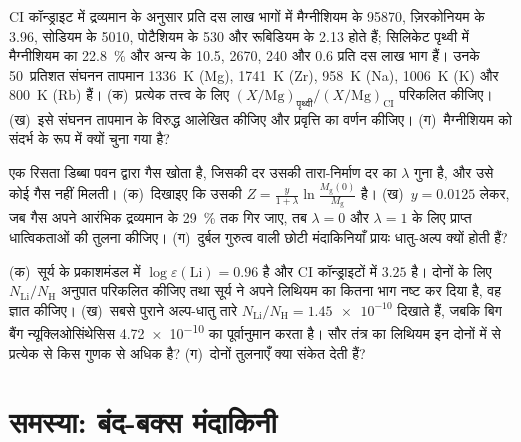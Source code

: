 \begin{exercise}[$\star\star\star$]\label{exo:b3:origin-of-elements:10}
CI कॉन्ड्राइट में द्रव्यमान के अनुसार प्रति दस लाख भागों में मैग्नीशियम के \num{95870},
ज़िरकोनियम के \num{3.96}, सोडियम के \num{5010}, पोटैशियम के \num{530}
और रूबिडियम के \num{2.13} होते हैं; सिलिकेट पृथ्वी में
मैग्नीशियम का \qty{22.8}{\percent} और अन्य के \num{10.5}, \num{2670}, \num{240}
और \num{0.6} प्रति दस लाख भाग हैं। उनके 50~प्रतिशत
संघनन तापमान \qty{1336}{K} (Mg), \qty{1741}{K} (Zr),
\qty{958}{K} (Na), \qty{1006}{K} (K) और \qty{800}{K} (Rb) हैं। (क)~प्रत्येक तत्त्व के लिए
$(X/\mathrm{Mg})_\text{पृथ्वी}/(X/\mathrm{Mg})_\mathrm{CI}$ परिकलित कीजिए।
(ख)~इसे संघनन तापमान के विरुद्ध आलेखित कीजिए और
प्रवृत्ति का वर्णन कीजिए। (ग)~मैग्नीशियम को संदर्भ के रूप में क्यों चुना गया है?
\end{exercise}

\begin{exercise}[$\star\star\star$]\label{exo:b3:origin-of-elements:11}
एक रिसता डिब्बा पवन द्वारा गैस खोता है, जिसकी दर उसकी
तारा-निर्माण दर का $\lambda$ गुना है, और उसे कोई गैस नहीं मिलती। (क)~दिखाइए कि उसकी 
$Z = \frac{y}{1 + \lambda}\ln\frac{M_\mathrm{g}(0)}{M_\mathrm{g}}$ है।
(ख)~$y = 0.0125$ लेकर, जब गैस अपने आरंभिक द्रव्यमान के
\qty{29}{\percent} तक गिर जाए, तब $\lambda = 0$ और
$\lambda = 1$ के लिए प्राप्त धात्विकताओं की तुलना कीजिए। (ग)~दुर्बल गुरुत्व वाली छोटी मंदाकिनियाँ
प्रायः धातु-अल्प क्यों होती हैं?
\end{exercise}

\begin{exercise}[$\star\star\star$]\label{exo:b3:origin-of-elements:12}
(क)~सूर्य के प्रकाशमंडल में $\log\varepsilon(\mathrm{Li}) = 0.96$ है और
CI कॉन्ड्राइटों में $3.25$ है। दोनों के लिए $N_\mathrm{Li}/N_\mathrm{H}$ अनुपात परिकलित कीजिए
तथा सूर्य ने अपने लिथियम का कितना भाग नष्ट कर दिया है, वह ज्ञात कीजिए। (ख)~सबसे पुराने
अल्प-धातु तारे $N_\mathrm{Li}/N_\mathrm{H} = \num{1.45e-10}$ दिखाते हैं,
जबकि बिग बैंग न्यूक्लिओसिंथेसिस \num{4.72e-10} का पूर्वानुमान करता है। सौर तंत्र का लिथियम
इन दोनों में से प्रत्येक से किस गुणक से अधिक है? (ग)~दोनों तुलनाएँ
क्या संकेत देती हैं?
\end{exercise}

\section{समस्या: बंद-बक्स मंदाकिनी}


